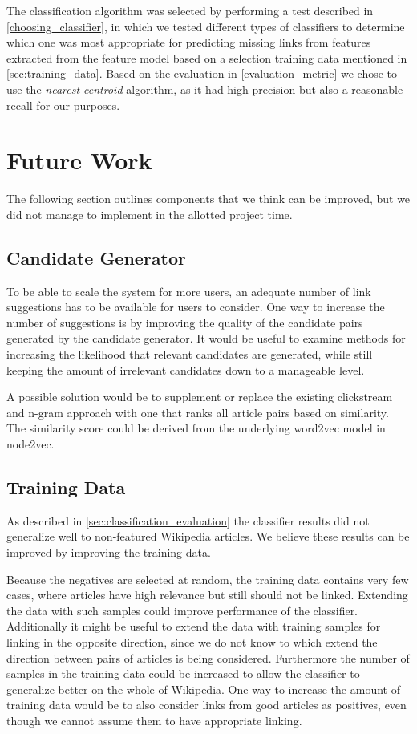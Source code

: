 The classification algorithm was selected by performing a test described in \cref{choosing_classifier}, in which we tested different types of classifiers to determine which one was most appropriate for predicting missing links from features extracted from the feature model based on a selection training data mentioned in \cref{sec:training_data}. Based on the evaluation in \cref{evaluation_metric} we chose to use the \emph{nearest centroid} algorithm, as it had high precision but also a reasonable recall for our purposes. 


\section{Future Work}\label{sec:future_work}
The following section outlines components that we think can be improved, but we did not manage to implement in the allotted project time.

\subsection{Candidate Generator}
To be able to scale the system for more users, an adequate number of link suggestions has to be available for users to consider. One way to increase the number of suggestions is by improving the quality of the candidate pairs generated by the candidate generator. It would be useful to examine methods for increasing the likelihood that relevant candidates are generated, while still keeping the amount of irrelevant candidates down to a manageable level.

A possible solution would be to supplement or replace the existing clickstream and n-gram approach with one that ranks all article pairs based on similarity. The similarity score could be derived from the underlying word2vec model in node2vec.

\subsection{Training Data}
As described in \cref{sec:classification_evaluation} the classifier results did not generalize well to non-featured Wikipedia articles. We believe these results can be improved by improving the training data.

Because the negatives are selected at random, the training data contains very few cases, where articles have high relevance but still should not be linked. Extending the data with such samples could improve performance of the classifier. Additionally it might be useful to extend the data with training samples for linking in the opposite direction, since we do not know to which extend the direction between pairs of articles is being considered. Furthermore the number of samples in the training data could be increased to allow the classifier to generalize better on the whole of Wikipedia. One way to increase the amount of training data would be to also consider links from good articles as positives, even though we cannot assume them to have appropriate linking.

